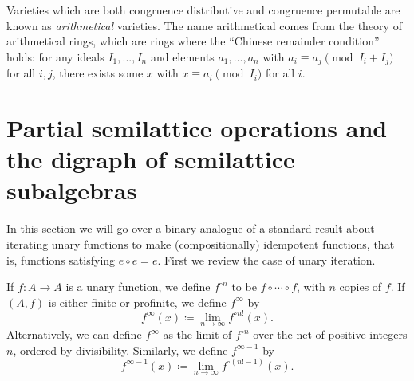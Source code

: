 Varieties which are both congruence distributive and congruence permutable are known as \emph{arithmetical} varieties. The name arithmetical comes from the theory of arithmetical rings, which are rings where the ``Chinese remainder condition'' holds: for any ideals $I_1, ..., I_n$ and elements $a_1, ..., a_n$ with $a_i \equiv a_j \pmod{I_i + I_j}$ for all $i,j$, there exists some $x$ with $x \equiv a_i \pmod{I_i}$ for all $i$.


\section{Partial semilattice operations and the digraph of semilattice subalgebras}\label{s-partial-semi}

In this section we will go over a binary analogue of a standard result about iterating unary functions to make (compositionally) idempotent functions, that is, functions satisfying $e \circ e = e$. First we review the case of unary iteration.

\begin{defn} If $f : A \rightarrow A$ is a unary function, we define $f^{\circ n}$ to be $f \circ \cdots \circ f$, with $n$ copies of $f$. If $(A,f)$ is either finite or profinite, we define $f^{\infty}$ by
\[
f^{\infty}(x) \coloneqq \lim_{n \rightarrow \infty} f^{\circ n!}(x).
\]
Alternatively, we can define $f^{\infty}$ as the limit of $f^{\circ n}$ over the net of positive integers $n$, ordered by divisibility. Similarly, we define $f^{\infty - 1}$ by
\[
f^{\infty - 1}(x) \coloneqq \lim_{n \rightarrow \infty} f^{\circ (n! - 1)}(x).
\]
\end{defn}

